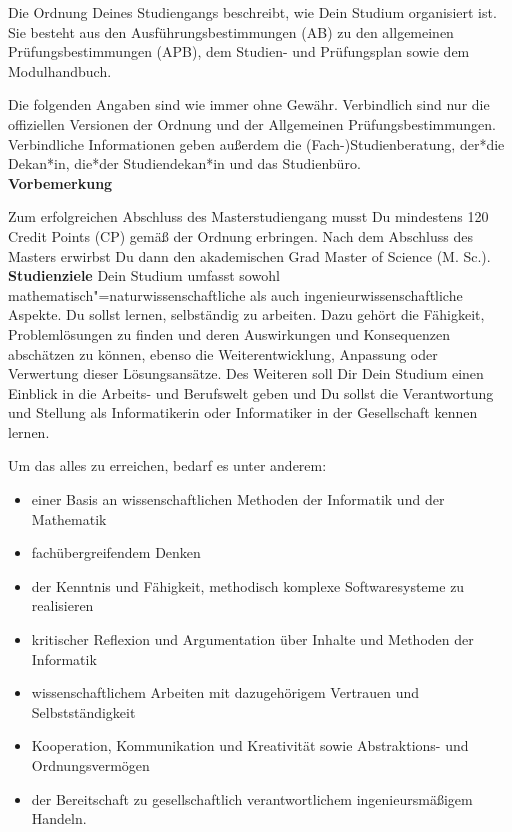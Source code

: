 {Die Ordnung Deines Studiengangs beschreibt, wie Dein Studium organisiert ist. Sie besteht aus den Ausführungsbestimmungen (AB) zu den allgemeinen Prüfungsbestimmungen (APB), dem Studien- und Prüfungsplan sowie dem Modulhandbuch.
}{
    Die folgenden Angaben sind wie immer ohne Gewähr. Verbindlich sind nur die offiziellen Versionen der Ordnung und der Allgemeinen Prüfungsbestimmungen. Verbindliche Informationen geben außerdem die (Fach-)Studienberatung, der*die Dekan*in, die*der Studiendekan*in und das Studienbüro.\\

    \noindent\textbf{Vorbemerkung}

    Zum erfolgreichen Abschluss des Masterstudiengang musst Du mindestens 120 Credit Points (CP) gemäß der Ordnung erbringen. Nach dem Abschluss des Masters erwirbst Du dann den akademischen Grad Master of Science (M. Sc.).\\

    \noindent\textbf{Studienziele}
    Dein Studium umfasst sowohl mathematisch"=naturwissenschaftliche als auch ingenieurwissenschaftliche Aspekte. Du sollst lernen, selbständig zu arbeiten. Dazu gehört die Fähigkeit, Problemlösungen zu finden und deren Auswirkungen und Konsequenzen abschätzen zu können, ebenso die Weiterentwicklung, Anpassung oder Verwertung dieser Lösungsansätze. Des Weiteren soll Dir Dein Studium einen Einblick in die Arbeits- und Berufswelt geben und Du sollst die Verantwortung und Stellung als Informatikerin oder Informatiker in der Gesellschaft kennen lernen.

    Um das alles zu erreichen, bedarf es unter anderem:
    \begin{itemize}
        \item einer Basis an wissenschaftlichen Methoden der Informatik und der Mathematik
        \item fachübergreifendem Denken
        \item der Kenntnis und Fähigkeit, methodisch komplexe Softwaresysteme zu realisieren
        \item kritischer Reflexion und Argumentation über Inhalte und Methoden der Informatik
        \item wissenschaftlichem Arbeiten mit dazugehörigem Vertrauen und Selbstständigkeit
        \item Kooperation, Kommunikation und Kreativität sowie Abstraktions- und Ordnungsvermögen
        \item der Bereitschaft zu gesellschaftlich verantwortlichem ingenieursmäßigem Handeln.
    \end{itemize}

}
